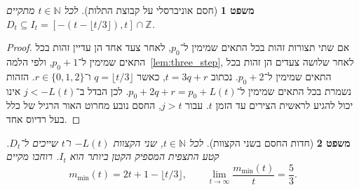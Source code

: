 \documentclass[11pt,a4paper]{article}
\newtheorem{theorem}{משפט}[section]
\theoremstyle{definition}
\begin{document}
\begin{theorem}[חסם אוניברסלי על קבוצת התלות]\label{thm:upper_bound}
לכל $t \in \mathbb{N}$ מתקיים $D_t \subseteq I_t = [-(t - \lfloor t/3 \rfloor), t] \cap \mathbb{Z}$.
\end{theorem}

\begin{proof}
אם שתי תצורות זהות בכל התאים שמימין ל־$p_0$, לאחר צעד אחד הן עדיין זהות בכל התאים שמימין ל־$p_0 + 1$, ולפי הלמה~\ref{lem:three_step}, לאחר שלושה צעדים הן זהות בכל התאים שמימין ל־$p_0 + 2$. נכתוב $t = 3q + r$, כאשר $q = \lfloor t/3 \rfloor$ ו־$r \in \{0, 1, 2\}$. הזהות נשמרת בכל התאים שמימין ל־$p_0 + 2q + r = p_0 + L(t)$. לכן הבדל ב־$j < -L(t)$ אינו יכול להגיע לראשית הצירים עד הזמן $t$. עבור $j > t$, החסם נובע מחרוט האור הרגיל של כלל בעל רדיוס אחד.
\end{proof}

\begin{theorem}[חדות החסם בשני הקצוות]\label{thm:sharpness}
לכל $t \in \mathbb{N}$, שני הקצוות $-L(t)$ ו־$t$ שייכים ל־$D_t$. קטע התצפית המספיק הקטן ביותר הוא $I_t$. רוחבו מקיים
\begin{equation}
m_{\min}(t) = 2t + 1 - \lfloor t/3 \rfloor, \qquad \lim_{t \to \infty} \frac{m_{\min}(t)}{t} = \frac{5}{3}.
\end{equation}
\end{theorem}
\end{document}
